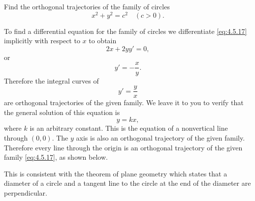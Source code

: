\documentclass{ximera}
\begin{document}
\begin{example}\label{example:4.5.9}
Find the orthogonal trajectories of the family of circles
\begin{equation} \label{eq:4.5.17}
x^2+y^2=c^2 \quad (c>0).
\end{equation}
 
\begin{explanation}
To find a differential equation for the family of circles we
differentiate \eqref{eq:4.5.17} implicitly with respect to $x$ to obtain
$$
2x+2yy'=0,
$$
or
$$
y'=-\frac{x}{y}.
$$
Therefore the integral curves  of
$$
y'=\frac{y}{x}
$$
are orthogonal trajectories of the given family. We leave it to you to
verify that the general solution of this equation is
$$
y=kx,
$$
where $k$ is an arbitrary constant. This is the equation of a
nonvertical line through $(0,0)$. The $y$ axis is also an orthogonal
trajectory of the given family. Therefore every line through the
origin is an orthogonal trajectory of the given family \eqref{eq:4.5.17}, as shown below.
 
\begin{center}
\end{center}
 
 
This is consistent with the theorem of plane
geometry which states that a diameter of a circle and a tangent line
to the circle at the end of the diameter are perpendicular.
\end{explanation}
\end{example}
 
\end{document}
